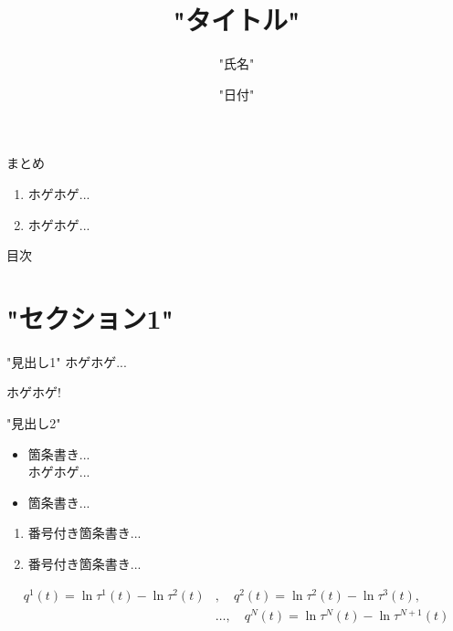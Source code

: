 \documentclass[aspectratio=169, dvipdfmx, 12pt]{beamer}
\title{"タイトル"}
\author{"氏名"}
\institute{"所属"} %
\date{"日付"} %
\begin{document}
\begin{frame}{まとめ} %
    \begin{enumerate}
        \item ホゲホゲ...
        \item ホゲホゲ...
    \end{enumerate}
\end{frame}

\frame{\maketitle} %

\begin{frame}{目次} %
    \tableofcontents
\end{frame}

\section{"セクション1"} %

\begin{frame}{"見出し1"} %
    ホゲホゲ...
    \begin{center}
        {\Huge{ホゲホゲ! }}
    \end{center}
\end{frame}

\begin{frame}{"見出し2"}
    \begin{itemize}
        \item 箇条書き...\\
        ホゲホゲ...
        \item 箇条書き...
    \end{itemize}
    \begin{enumerate}
        \item 番号付き箇条書き...
        \item 番号付き箇条書き...
    \end{enumerate}
    \begin{align*}
        q^1 (t) = \ln \tau^1 (t) - \ln \tau^2 (t)&,\quad q^2 (t) = \ln \tau^2 (t) - \ln \tau^3 (t), \\
        &\ldots, \quad q^N (t) = \ln \tau^N (t) - \ln \tau^{N+1} (t) 
    \end{align*}
\end{frame}
\end{document}
